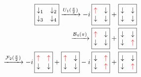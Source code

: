 \documentclass[prl,aps,twocolumn,showpacs,superscriptaddress,longbibliography]{revtex4-1}
\begin{document}
\begin{eqnarray}
%
\boxed{
\begin{matrix}
  \downarrow_1 & \downarrow_2 \\
  \downarrow_3 & \downarrow_4
 \end{matrix}
}
	\xrightarrow[]{U_1(\frac{\pi}{2})}
-i \, \boxed{
\begin{matrix}
  {\color{red} \uparrow} & \downarrow \\
  \downarrow & \downarrow
 \end{matrix}
}
+
\boxed{
\begin{matrix}
  \downarrow & \downarrow \\
  \downarrow & \downarrow
 \end{matrix}
} 
\nonumber \\
	\xrightarrow[]{\mathcal{B}_4(\pi)}
\boxed{
\begin{matrix}
  {\color{red} \uparrow} & \downarrow \\
  \downarrow & \downarrow
 \end{matrix}
}
+
\boxed{
\begin{matrix}
  \downarrow & \downarrow \\
  \downarrow & {\color{red} \uparrow}
 \end{matrix}
} 
\nonumber \\
	\xrightarrow[]{\mathcal{F}_2(\frac{\pi}{2})}
-i\,\boxed{
\begin{matrix}
  {\color{red} \uparrow} & {\color{red} \uparrow} \\
  \downarrow & \downarrow
 \end{matrix}
}
+
\boxed{
\begin{matrix}
  {\color{red} \uparrow} & \downarrow \\
  \downarrow & \downarrow
 \end{matrix}
}
-i\,\boxed{
\begin{matrix}
  \downarrow & {\color{red} \uparrow} \\
  \downarrow & {\color{red} \uparrow}
 \end{matrix}
}
+
\boxed{
\begin{matrix}
  \downarrow & \downarrow \\
  \downarrow & {\color{red} \uparrow}
 \end{matrix}
} 
\nonumber \\

\end{eqnarray}
\end{document}
